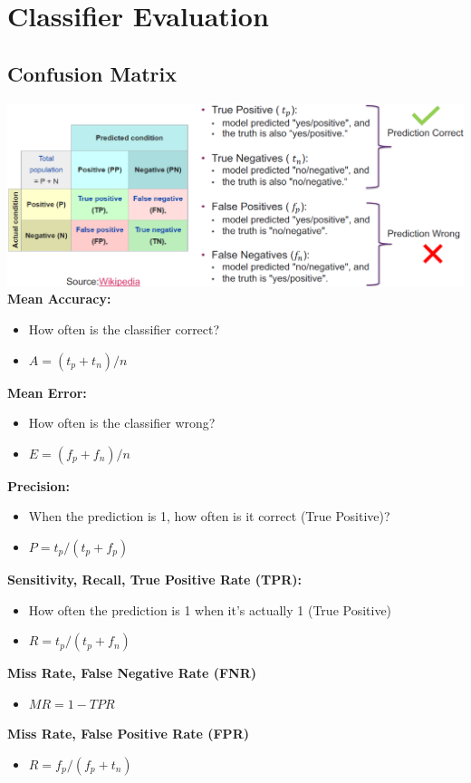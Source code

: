 \section{Classifier Evaluation}
\subsection{Confusion Matrix}
\includegraphics[width=\linewidth]{./img/confusion_matrix.png}
\textbf{Mean Accuracy:}
\begin{itemize}
    \item How often is the classifier correct?
    \item $A = (t_p + t_n) / n$
\end{itemize}
\textbf{Mean Error:}
\begin{itemize}
    \item How often is the classifier wrong?
    \item $E = (f_p + f_n) / n$
\end{itemize}
\textbf{Precision:}
\begin{itemize}
    \item When the prediction is 1, how often is it correct (True Positive)?
    \item $P = t_p / (t_p + f_p)$
\end{itemize}
\textbf{Sensitivity, Recall, True Positive Rate (TPR):}
\begin{itemize}
    \item How often the prediction is 1 when it's actually 1 (True Positive)
    \item $R = t_p / (t_p + f_n)$
\end{itemize}
\textbf{Miss Rate, False Negative Rate (FNR)}
\begin{itemize}
    \item $MR = 1 - TPR$
\end{itemize}
\textbf{Miss Rate, False Positive Rate (FPR)}
\begin{itemize}
    \item $R = f_p / (f_p + t_n)$
\end{itemize}

